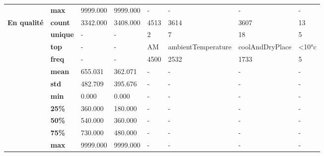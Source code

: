 \begin{tabularx}{\linewidth}{lXXXXXXX}
           & \textbf{max} &             9999.000 &                 9999.000 &                    - &                       - &                       - &           - \\
\cline{1-8}
\multirow{11}{*}{\textbf{En qualité}} & \textbf{count} &             3342.000 &                 3408.000 &                 4513 &                    3614 &                    3607 &          13 \\
           & \textbf{unique} &                    - &                        - &                    2 &                       7 &                      18 &           5 \\
           & \textbf{top} &                    - &                        - &                   AM &      ambientTemperature &         coolAndDryPlace &       <10°c \\
           & \textbf{freq} &                    - &                        - &                 4500 &                    2532 &                    1733 &           5 \\
           & \textbf{mean} &              655.031 &                  362.071 &                    - &                       - &                       - &           - \\
           & \textbf{std} &              482.709 &                  395.676 &                    - &                       - &                       - &           - \\
           & \textbf{min} &                0.000 &                    0.000 &                    - &                       - &                       - &           - \\
           & \textbf{25\%} &              360.000 &                  180.000 &                    - &                       - &                       - &           - \\
           & \textbf{50\%} &              540.000 &                  360.000 &                    - &                       - &                       - &           - \\
           & \textbf{75\%} &              730.000 &                  480.000 &                    - &                       - &                       - &           - \\
           & \textbf{max} &             9999.000 &                 9999.000 &                    - &                       - &                       - &           - \\
\bottomrule
\end{tabularx}
